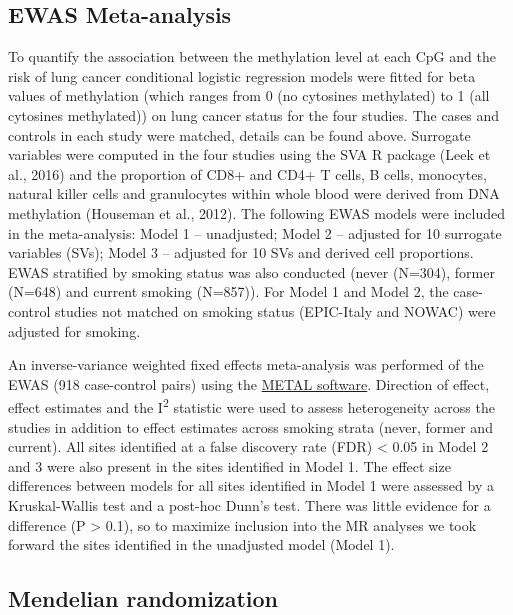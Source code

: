 \documentclass[11pt,twoside]{bristolthesis}
\begin{document}
\hypertarget{ewas-meta-analysis}{%
\subsection{EWAS Meta-analysis}\label{ewas-meta-analysis}}

To quantify the association between the methylation level at each CpG and the risk of lung cancer conditional logistic regression models were fitted for beta values of methylation (which ranges from 0 (no cytosines methylated) to 1 (all cytosines methylated)) on lung cancer status for the four studies. The cases and controls in each study were matched, details can be found above. Surrogate variables were computed in the four studies using the SVA R package (Leek et al., 2016) and the proportion of CD8+ and CD4+ T cells, B cells, monocytes, natural killer cells and granulocytes within whole blood were derived from DNA methylation (Houseman et al., 2012). The following EWAS models were included in the meta-analysis: Model 1 -- unadjusted; Model 2 -- adjusted for 10 surrogate variables (SVs); Model 3 -- adjusted for 10 SVs and derived cell proportions. EWAS stratified by smoking status was also conducted (never (N=304), former (N=648) and current smoking (N=857)). For Model 1 and Model 2, the case-control studies not matched on smoking status (EPIC-Italy and NOWAC) were adjusted for smoking.

An inverse-variance weighted fixed effects meta-analysis was performed of the EWAS (918 case-control pairs) using the \href{http://csg.sph.umich.edu/abecasis/metal/}{METAL software}. Direction of effect, effect estimates and the I\textsuperscript{2} statistic were used to assess heterogeneity across the studies in addition to effect estimates across smoking strata (never, former and current). All sites identified at a false discovery rate (FDR) \textless{} 0.05 in Model 2 and 3 were also present in the sites identified in Model 1. The effect size differences between models for all sites identified in Model 1 were assessed by a Kruskal-Wallis test and a post-hoc Dunn's test. There was little evidence for a difference (P \textgreater{} 0.1), so to maximize inclusion into the MR analyses we took forward the sites identified in the unadjusted model (Model 1).

\hypertarget{mendelian-randomization}{%
\subsection{Mendelian randomization}\label{mendelian-randomization}}
\end{document}

